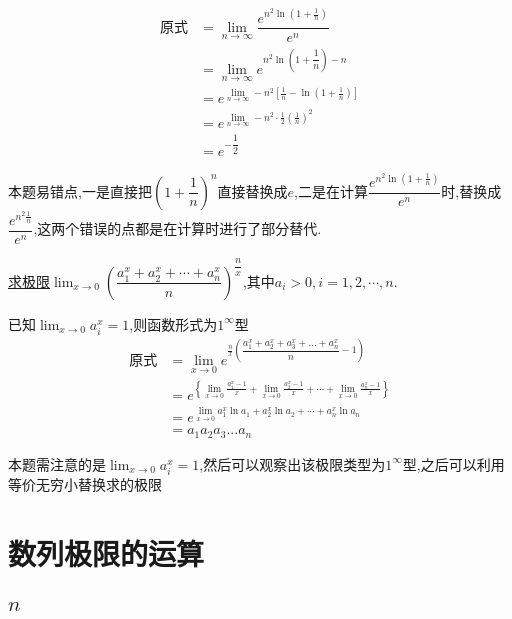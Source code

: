 \documentclass[8pt a4paper, oneside, UTF8]{ctexbook}
\begin{document}
\begin{sloppypar}
\begin{solution}
            \begin{align*}
                \text{原式} & = \lim_{n\to \infty} \dfrac{e^{n^2\ln(1+\frac{1}{n})}}{e^n}\\
                & = \lim_{n\to \infty} e^{n^2\ln(1+\dfrac{1}{n})-n}\\
                & = e^{\lim_{n\to\infty}-n^2{\left[\frac1n-\ln(1+\frac1n)\right]}}\\
                & = e^{\lim_{n\to\infty}-n^2\cdot\frac12(\frac1n)^2}\\
                & =e^{-\dfrac{1}{2}}
            \end{align*}   
        \end{solution}
        \begin{note}
            本题易错点,一是直接把$(1+\dfrac{1}{n})^n$直接替换成$e$,二是在计算$\dfrac{e^{n^2\ln(1+\frac{1}{n})}}{e^n}$时,替换成$\dfrac{e^{n^2\frac{1}{n}}}{e^n}$,这两个错误的点都是在计算时进行了部分替代.
        \end{note}
    \begin{problem}
        \uline{求极限}$\lim_{x\to0}\left(\dfrac{a_1 ^x+a_2^x+\cdots+a_n^x}n\right)^{\dfrac nx}$,其中$a_i>0,i=1,2,\cdots,n.$ 
    \end{problem}
    \begin{solution}
        已知$\lim_{x\to 0} a_i^x = 1$,则函数形式为$1^{\infty}$型
        \begin{align*}
          \text{原式} & = \lim_{x\to 0} e^{\frac{n}{x}(\dfrac{a_1^x+a_2^x+a_3^x+...+a_n^x}{n}-1)}\\
          & = e^{\left\{\lim_{x\to0}\frac{a_{1}^{x}-1}{x}+\lim_{x\to0}\frac{a_{2}^{x}-1}{x}+\cdots+\lim_{x\to0}\frac{a_{n}^{x}-1}{x}\right\}}\\
          & = e^{\lim_{x\to0}a_{1}^{x}\ln a_{1}+a_{2}^{x}\ln a_{2}+\cdots+a_{n}^{x}\ln a_{n}}\\
          & = a_1 a_2 a_3 ... a_n
        \end{align*}
    \end{solution}
    \begin{note}
        本题需注意的是$\lim_{x\to 0} a_i^x = 1$,然后可以观察出该极限类型为$1^{\infty}$型,之后可以利用等价无穷小替换求的极限
    \end{note}
    \section{数列极限的运算}
    \subsection{\texorpdfstring{$n$}}

\end{sloppypar}
\end{document}
